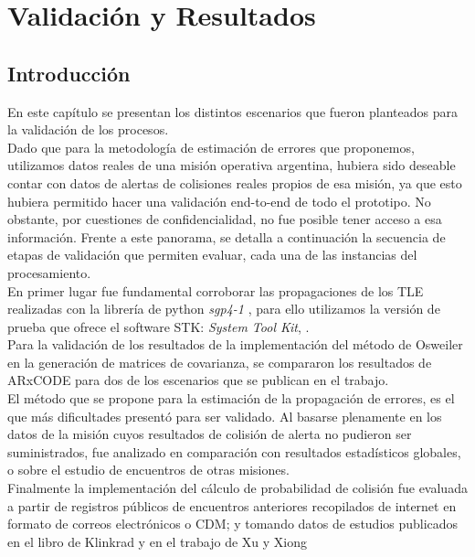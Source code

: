 \chapter{Validaci\'on y Resultados}
\label{chap:resultados}


\section{Introducci\'on}
En este cap\'itulo se presentan los distintos escenarios que fueron planteados para la validaci\'on de los procesos.\\

Dado que para la metodolog\'ia de estimaci\'on de errores que proponemos, utilizamos datos reales de una misi\'on operativa argentina, hubiera sido
deseable contar con datos de alertas de colisiones reales propios de esa misi\'on, ya que esto hubiera permitido hacer una validaci\'on end-to-end de todo el prototipo. No obstante, por cuestiones de confidencialidad, no fue posible tener acceso a esa informaci\'on.
Frente a este panorama, se detalla a continuaci\'on la secuencia de etapas de validaci\'on que permiten evaluar, cada una de las instancias del procesamiento.\\

En primer lugar fue fundamental corroborar las propagaciones de los TLE realizadas con la librer\'ia de python {\it{sgp4-1}} \citep{sgp4python}, para ello utilizamos la versi\'on de prueba que ofrece el software STK: {\it{System Tool Kit}}, \citep{stk}.\\

Para la validaci\'on de los resultados de la implementaci\'on del m\'etodo de Osweiler en la generaci\'on de matrices de covarianza, se compararon los resultados de ARxCODE para dos de los escenarios que se publican en el trabajo.\\

El m\'etodo que se propone para la estimaci\'on de la propagaci\'on de errores, es el que m\'as dificultades present\'o para ser validado. Al basarse plenamente en los datos de la misi\'on cuyos resultados de colisi\'on de alerta no pudieron ser suministrados, fue analizado en comparaci\'on con resultados estad\'isticos globales, o sobre el estudio de encuentros de otras misiones.\\

Finalmente la implementaci\'on del c\'alculo de probabilidad de colisi\'on fue evaluada a partir de registros p\'ublicos de encuentros anteriores recopilados de internet en formato de correos electr\'onicos o CDM; y tomando datos de estudios publicados en el libro de Klinkrad \citep{Klinkrad} y en el trabajo de Xu y Xiong \citep{xu2014method}\\

